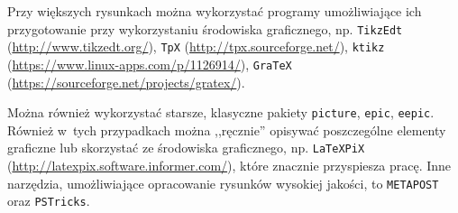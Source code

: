 Przy większych rysunkach można wykorzystać programy umożliwiające ich przygotowanie przy wykorzystaniu środowiska graficznego, np. \verb+TikzEdt+ (\url{http://www.tikzedt.org/}), \verb+TpX+ (\url{http://tpx.sourceforge.net/}), \verb+ktikz+ (\url{https://www.linux-apps.com/p/1126914/}), \verb+GraTeX+ (\url{https://sourceforge.net/projects/gratex/}).

Można również wykorzystać starsze, klasyczne pakiety \verb+picture+, \verb+epic+, \verb+eepic+. Również w~tych przypadkach można ,,ręcznie'' opisywać poszczególne elementy graficzne lub skorzystać ze środowiska graficznego, np. \verb+LaTeXPiX+ (\url{http://latexpix.software.informer.com/}), które znacznie przyspiesza pracę. Inne narzędzia, umożliwiające opracowanie rysunków wysokiej jakości, to \verb+METAPOST+ oraz \verb+PSTricks+.

